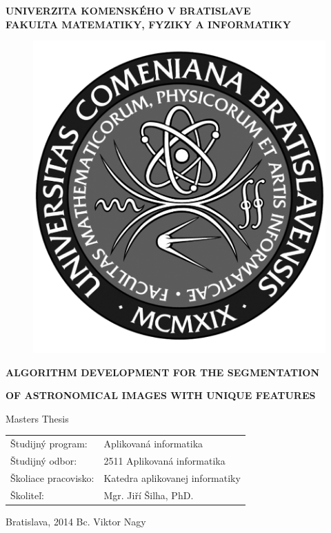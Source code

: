 \documentclass[12pt, a4paper, oneside]{book}
\newcommand\mfthesistype{Masters Thesis}
\newcommand\mfauthor{Bc. Viktor Nagy}
\newcommand\mfadvisor{Mgr. Jiří Šilha, PhD.}
\newcommand\mfplacedate{Bratislava, 2014}
\newcommand\mfuniversity{UNIVERZITA KOMENSKÉHO V BRATISLAVE}
\newcommand\mffaculty{FAKULTA MATEMATIKY, FYZIKY A INFORMATIKY}
\begin{document}
\thispagestyle{empty}

\noindent
\begin{minipage}{\textwidth}
\begin{center}
\textbf{\mfuniversity \\
\mffaculty}
\end{center}
\end{minipage}

\vfill
\begin{figure}[!hbt]
\begin{center}
\includegraphics{images/logo_fmph_dark}
\label{img:logo_dark}
\end{center}
\end{figure}
\begin{center}
\begin{minipage}{0.8\textwidth}
        \centerline{\textbf{\Large\MakeUppercase{Algorithm development for the segmentation}}}
        \centerline{\textbf{\Large\MakeUppercase{of astronomical images with unique features}}}
\smallskip
\centerline{\mfthesistype}
\end{minipage}
\end{center}
\vfill
\begin{tabular}{l l}
Študijný program: & Aplikovaná informatika\\
Študijný odbor: & 2511 Aplikovaná informatika\\
Školiace pracovisko: & Katedra aplikovanej informatiky\\
Školiteľ: & \mfadvisor
\end{tabular}
\vfill
\noindent
\mfplacedate \hfill
\mfauthor
\eject
\end{document}
